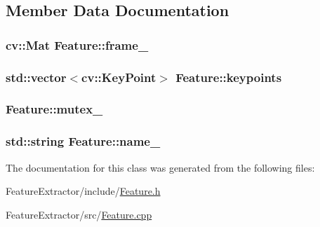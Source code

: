 \subsection{Member Data Documentation}
\hypertarget{class_feature_aa805e6fee8eeec2061feabe29430f0df}{
\subsubsection[{frame\-\_\-}]{\setlength{\rightskip}{0pt plus 5cm}cv\-::\-Mat {\bf Feature\-::frame\-\_\-}}}\label{class_feature_aa805e6fee8eeec2061feabe29430f0df}
\hypertarget{class_feature_a7e1fc96f926cad9da3db0397a99c0079}{
\subsubsection[{keypoints}]{\setlength{\rightskip}{0pt plus 5cm}std\-::vector$<$cv\-::\-Key\-Point$>$ {\bf Feature\-::keypoints}}}\label{class_feature_a7e1fc96f926cad9da3db0397a99c0079}
\hypertarget{class_feature_a08499ba9b2c77ef9a29f97d6a8f66006}{
\subsubsection[{mutex\-\_\-}]{ {\bf Feature\-::mutex\-\_\-}}}\label{class_feature_a08499ba9b2c77ef9a29f97d6a8f66006}
\hypertarget{class_feature_a46e9fc1f327aaafb10de2c0425d311aa}{
\subsubsection[{name\-\_\-}]{\setlength{\rightskip}{0pt plus 5cm}std\-::string {\bf Feature\-::name\-\_\-}}}\label{class_feature_a46e9fc1f327aaafb10de2c0425d311aa}


The documentation for this class was generated from the following files\-:\begin{DoxyCompactItemize}
\item 
Feature\-Extractor/include/\hyperlink{_feature_8h}{Feature.\-h}\item 
Feature\-Extractor/src/\hyperlink{_feature_8cpp}{Feature.\-cpp}\end{DoxyCompactItemize}
